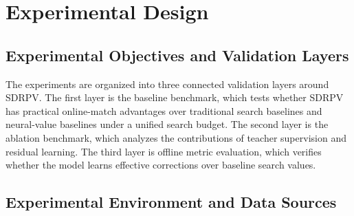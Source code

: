 

\chapter{Experimental Design}
\setcounter{figure}{0}
\setcounter{equation}{0}
\renewcommand{\thefigure}{\thechapter-\arabic{figure}}
\renewcommand{\theequation}{\thechapter-\arabic{equation}}


\section{Experimental Objectives and Validation Layers}


The experiments are organized into three connected validation layers around SDRPV. The first layer is the baseline benchmark, which tests whether SDRPV has practical online-match advantages over traditional search baselines and neural-value baselines under a unified search budget. The second layer is the ablation benchmark, which analyzes the contributions of teacher supervision and residual learning. The third layer is offline metric evaluation, which verifies whether the model learns effective corrections over baseline search values.


\section{Experimental Environment and Data Sources}


